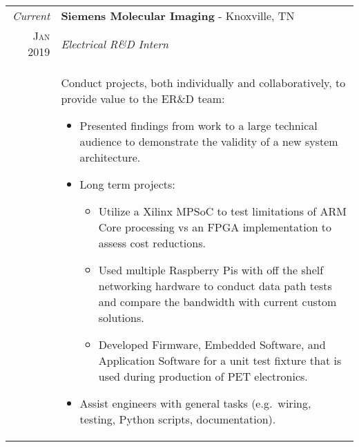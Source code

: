\documentclass[a4paper,11pt]{article}
\begin{document}
%
%
\begin{tabularx}{\textwidth}{r|X}
   \emph{Current} & \textbf{Siemens Molecular Imaging} \-- Knoxville, TN\\
   \textsc{Jan 2019} & \emph{Electrical R\&D Intern}\\
   & \small{Conduct projects, both individually and collaboratively, to provide value to the ER\&D team:
      \begin{itemize}[leftmargin=20pt,topsep=1pt,itemsep=1pt,partopsep=0pt, parsep=1pt]
         \item Presented findings from work to a large technical audience to demonstrate the validity of a new system architecture.
         \item Long term projects:
            \begin{itemize}[leftmargin=20pt,topsep=1pt,itemsep=1pt,partopsep=0pt, parsep=1pt]
               \item Utilize a Xilinx MPSoC to test limitations of ARM Core processing vs an FPGA implementation to assess cost reductions.
               \item Used multiple Raspberry Pis with off the shelf networking hardware to conduct data path tests and compare the bandwidth with current custom solutions.
               \item Developed Firmware, Embedded Software, and Application Software for a unit test fixture that is used during production of PET electronics.
            \end{itemize}
         \item Assist engineers with general tasks (e.g.\ wiring, testing, Python scripts, documentation).
      \vspace{-0.5cm}
      \end{itemize}}\\
\end{tabularx}
\end{document}
